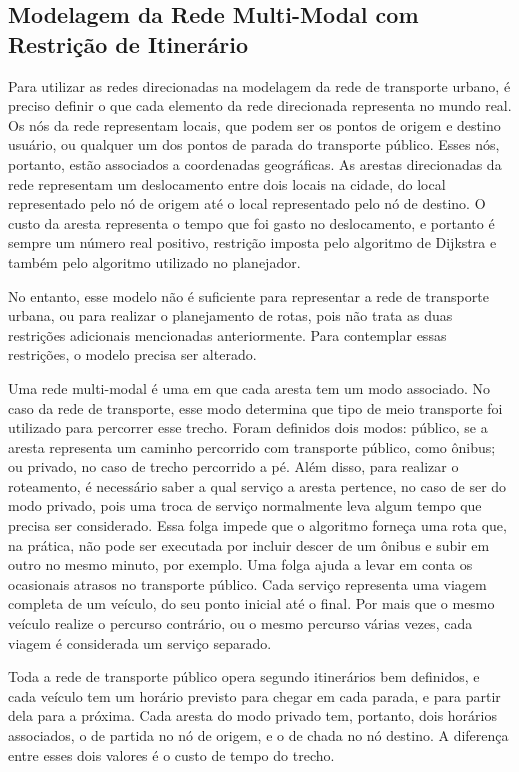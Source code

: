 \subsection{Modelagem da Rede Multi-Modal com Restrição de Itinerário}

Para utilizar as redes direcionadas na modelagem da rede de transporte urbano, é preciso definir o que cada elemento da rede direcionada representa no mundo real. Os nós da rede representam locais, que podem ser os pontos de origem e destino usuário, ou qualquer um dos pontos de parada do transporte público. Esses nós, portanto, estão associados a coordenadas geográficas.
As arestas direcionadas da rede representam um deslocamento entre dois locais na cidade, do local representado pelo nó de origem até o local representado pelo nó de destino. O custo da aresta representa o tempo que foi gasto no deslocamento, e portanto é sempre um número real positivo, restrição imposta pelo algoritmo de Dijkstra e também pelo algoritmo utilizado no planejador.

No entanto, esse modelo não é suficiente para representar a rede de transporte urbana, ou para realizar o planejamento de rotas, pois não trata as duas restrições adicionais mencionadas anteriormente.
Para contemplar essas restrições, o modelo precisa ser alterado.

Uma rede multi-modal é uma em que cada aresta tem um modo associado. 
No caso da rede de transporte, esse modo determina que tipo de meio transporte foi utilizado para percorrer esse trecho.
Foram definidos dois modos: público, se a aresta representa um caminho percorrido com transporte público, como ônibus; ou privado, no caso de trecho percorrido a pé.
Além disso, para realizar o roteamento, é necessário saber a qual serviço a aresta pertence, no caso de ser do modo privado, pois uma troca de serviço normalmente leva algum tempo que precisa ser considerado. Essa folga impede que o algoritmo forneça uma rota que, na prática, não pode ser executada por incluir descer de um ônibus e subir em outro no mesmo minuto, por exemplo. Uma folga ajuda a levar em conta os ocasionais atrasos no transporte público.
Cada serviço representa uma viagem completa de um veículo, do seu ponto inicial até o final. Por mais que o mesmo veículo realize o percurso contrário, ou o mesmo percurso várias vezes, cada viagem é considerada um serviço separado.

Toda a rede de transporte público opera segundo itinerários bem definidos, e cada veículo tem um horário previsto para chegar em cada parada, e para partir dela para a próxima.
Cada aresta do modo privado tem, portanto, dois horários associados, o de partida no nó de origem, e o de chada no nó destino.
A diferença entre esses dois valores é o custo de tempo do trecho.

